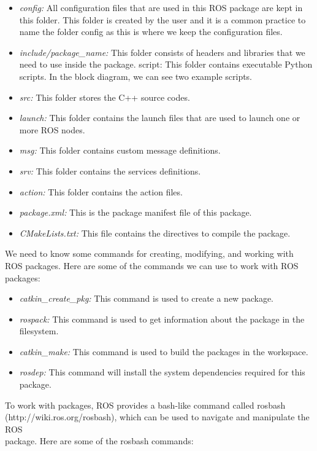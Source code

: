 \documentclass[../../main]{subfiles}
\begin{document}
\begin{itemize}
    \item \emph{config:} All configuration files that are used in this ROS package are kept in this
    folder. This folder is created by the user and it is a common practice to name the
    folder config as this is where we keep the configuration files.
    \item \emph{include/package\_name:} This folder consists of headers and libraries that we
    need to use inside the package.
    script: This folder contains executable Python scripts. In the block diagram, we
can see two example scripts.
\item \emph{src:} This folder stores the C++ source codes.
\item \emph{launch:} This folder contains the launch files that are used to launch one or more
ROS nodes.
\item \emph{msg:} This folder contains custom message definitions.
\item \emph{srv:} This folder contains the services definitions.
\item \emph{action:} This folder contains the action files.
\item \emph{package.xml:} This is the package manifest file of this package.
\item \emph{CMakeLists.txt:} This file contains the directives to compile the package.
    
\end{itemize}
We need to know some commands for creating, modifying, and working with ROS
packages. Here are some of the commands we can use to work with ROS packages:
\begin{itemize}
\item \emph{catkin\_create\_pkg:} This command is used to create a new package.
\item \emph{rospack:} This command is used to get information about the package in the
filesystem.
\item \emph{catkin\_make:} This command is used to build the packages in the workspace.
\item \emph{rosdep:} This command will install the system dependencies required for this
package.
\end{itemize}
To work with packages, ROS provides a bash-like command called rosbash \\
(http://wiki.ros.org/rosbash), which can be used to navigate and manipulate the
ROS\\
package. Here are some of the rosbash commands:
\end{document}
